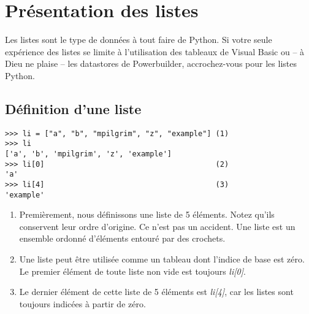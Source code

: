 \section{Présentation des listes}\label{Présentation des listes}

Les listes sont le type de données à tout faire de Python. Si votre seule expérience des listes se limite à l'utilisation des tableaux de Visual Basic ou -- à Dieu ne plaise -- les datastores de Powerbuilder, accrochez-vous pour les listes Python.



\subsection{Définition d'une liste}

\begin{example}
\begin{lstlisting}
>>> li = ["a", "b", "mpilgrim", "z", "example"] (1)
>>> li
['a', 'b', 'mpilgrim', 'z', 'example']
>>> li[0]                                       (2)
'a'
>>> li[4]                                       (3)
'example'
\end{lstlisting}
\end{example}

\begin{enumerate}
\item{Premièrement, nous définissons une liste de 5 éléments. Notez qu'ils conservent leur ordre d'origine. Ce n'est pas un accident. Une liste est un ensemble ordonné d'éléments entouré par des crochets.}
\item{Une liste peut être utilisée comme un tableau dont l'indice de base est zéro. Le premier élément de toute liste non vide est toujours \emph{li[0]}.}
\item{Le dernier élément de cette liste de 5 éléments est \emph{li[4]}, car les listes sont toujours indicées à partir de zéro.}
\end{enumerate}


